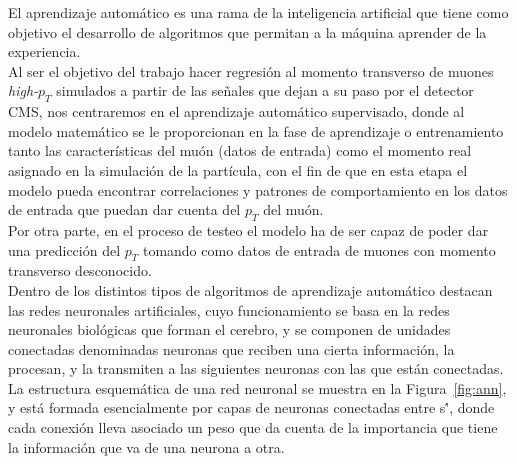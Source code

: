 El aprendizaje autom\'atico es una rama de la inteligencia artificial que tiene como objetivo el desarrollo de algoritmos que permitan a la m\'aquina aprender de la experiencia. \\

Al ser el objetivo del trabajo hacer regresi\'on al momento transverso de muones \textit{high-$p_{T}$} simulados a partir de las se\~nales que dejan a su paso por el detector CMS, nos centraremos en el aprendizaje autom\'atico supervisado, donde al modelo matem\'atico se le proporcionan en la fase de aprendizaje o entrenamiento tanto las caracter\'isticas del mu\'on (datos de entrada) como el momento real asignado en la simulaci\'on de la part\'icula, con el fin de que en esta etapa el modelo pueda encontrar correlaciones y patrones de comportamiento en los datos de entrada que puedan dar cuenta del $p_{T}$ del mu\'on. \\
Por otra parte, en el proceso de testeo el modelo ha de ser capaz de poder dar una predicci\'on del $p_{T}$ tomando como datos de entrada de muones con momento transverso desconocido. \\

Dentro de los distintos tipos de algoritmos de aprendizaje autom\'atico destacan las redes neuronales artificiales, cuyo funcionamiento se basa en la redes neuronales biol\'ogicas que forman el cerebro, y se componen de unidades conectadas denominadas neuronas que reciben una cierta informaci\'on, la procesan, y la transmiten a las siguientes neuronas con las que est\'an conectadas. La estructura esquem\'atica de una red neuronal se muestra en la Figura~\ref{fig:ann}, y est\'a formada esencialmente por capas de neuronas conectadas entre s\'', donde cada conexi\'on lleva asociado un peso que da cuenta de la importancia que tiene la informaci\'on que va de una neurona a otra. \\

